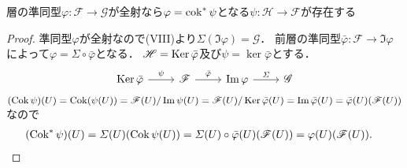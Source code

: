 \begin{screen}
  層の準同型$\varphi\colon\mathscr{F}\to\mathscr{G}$が全射なら$\varphi = \operatorname{cok}^\ast\psi$となる$\psi\colon\mathscr{H}\to\mathscr{F}$が存在する
\end{screen}
\begin{proof}
  準同型$\varphi$が全射なので(VIII)より$\varSigma(\Im\varphi) = \mathscr{G}$．
  前層の準同型$\bar\varphi\colon\mathscr{F}\to\Im\varphi$によって$\varphi = \varSigma\circ\bar\varphi$となる．
  $\mathscr{H} = \operatorname{Ker}\bar\varphi$及び$\psi = \ker\bar\varphi$とする．
  \[
  \begin{tikzcd}
    \Ker\bar\varphi \arrow[r, "\psi"] & \mathscr{F} \arrow[r, "\bar\varphi"] & \Im\varphi \arrow[r, "\varSigma"] & \mathscr{G}
  \end{tikzcd}
  \]
  $(\operatorname{Cok}\psi)(U) = \operatorname{Cok}(\psi(U)) = \mathscr{F}(U)/\operatorname{Im}\psi(U) = \mathscr{F}(U)/\operatorname{Ker}\bar\varphi(U) = \operatorname{Im} \bar\varphi(U) = \bar\varphi(U)(\mathscr{F}(U))$なので
  \begin{align*}
    (\operatorname{Cok}^\ast\psi)(U) &= \varSigma(U)(\operatorname{Cok}\psi(U)) = \varSigma(U) \circ \bar\varphi(U)(\mathscr{F}(U)) = \varphi(U)(\mathscr{F}(U)) .
  \end{align*}
\end{proof}

